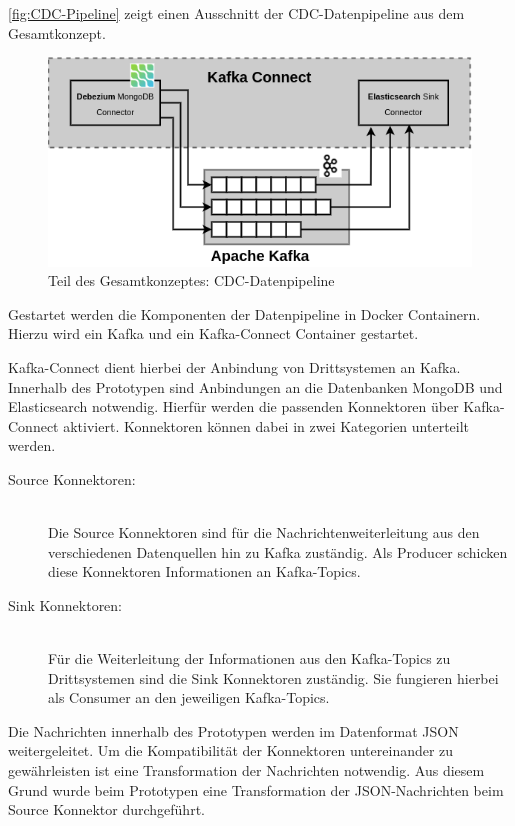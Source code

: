\autoref{fig:CDC-Pipeline} zeigt einen Ausschnitt der CDC-Datenpipeline aus dem Gesamtkonzept.

\begin{figure}[H]
    \centering
    \includegraphics[width=0.9\linewidth]{images/CDC-Pipeline.png}
    \caption{Teil des Gesamtkonzeptes: CDC-Datenpipeline}
    \label{fig:CDC-Pipeline}
\end{figure}

Gestartet werden die Komponenten der Datenpipeline in Docker Containern. Hierzu wird ein Kafka und ein Kafka-Connect Container gestartet.

Kafka-Connect dient hierbei der Anbindung von Drittsystemen an Kafka. Innerhalb des Prototypen sind Anbindungen an die Datenbanken MongoDB und Elasticsearch notwendig. Hierfür werden die passenden Konnektoren über Kafka-Connect aktiviert. Konnektoren können dabei in zwei Kategorien unterteilt werden.

\begin{description}
    \item[Source Konnektoren:]\hfill \\
    Die Source Konnektoren sind für die Nachrichtenweiterleitung aus den verschiedenen Datenquellen hin zu Kafka zuständig. Als Producer schicken diese Konnektoren Informationen an Kafka-Topics.
    
    \item[Sink Konnektoren:]\hfill \\ 
    Für die Weiterleitung der Informationen aus den Kafka-Topics zu Drittsystemen sind die Sink Konnektoren zuständig. Sie fungieren hierbei als Consumer an den jeweiligen Kafka-Topics.

\end{description}

Die Nachrichten innerhalb des Prototypen werden im Datenformat JSON weitergeleitet. Um die Kompatibilität der Konnektoren untereinander zu gewährleisten ist eine Transformation der Nachrichten notwendig. Aus diesem Grund wurde beim Prototypen eine Transformation der JSON-Nachrichten beim Source Konnektor durchgeführt.

